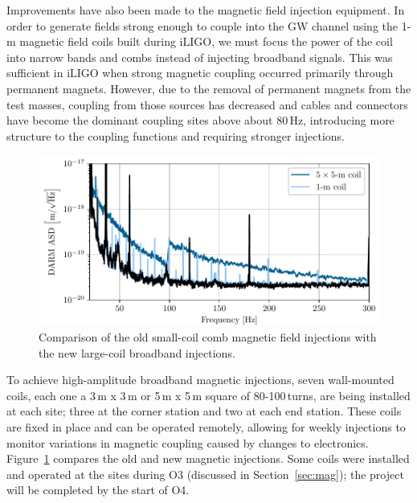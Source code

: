 Improvements have also been made to the magnetic field injection equipment. In order to generate fields strong enough to couple into the \ac{GW} channel using the 1-m magnetic field coils built during \ac{iLIGO}, we must focus the power of the coil into narrow bands and combs instead of injecting broadband signals. This was sufficient in \ac{iLIGO} when strong magnetic coupling occurred primarily through permanent magnets. However, due to the removal of permanent magnets from the test masses, coupling from those sources has decreased and cables and connectors have become the dominant coupling sites above about 80\,Hz, introducing more structure to the coupling functions and requiring stronger injections.

\begin{figure}[h!]
	\centering
	\includegraphics{figures/noise-methods/injection-wallcoil.pdf}
	\caption{
		Comparison of the old small-coil comb magnetic field injections with the new large-coil broadband injections.}
	\label{fig:injection-wallcoil}
\end{figure}

To achieve high-amplitude broadband magnetic injections, seven wall-mounted coils, each one a 3\,m x 3\,m or 5\,m x 5\,m square of 80-100\,turns, are being installed at each site; three at the corner station and two at each end station. These coils are fixed in place and can be operated remotely, allowing for weekly injections to monitor variations in magnetic coupling caused by changes to electronics.
Figure~\ref{fig:injection-wallcoil} compares the old and new magnetic injections. Some coils were installed and operated at the sites during O3 (discussed in Section~\ref{sec:mag}); the project will be completed by the start of O4.







